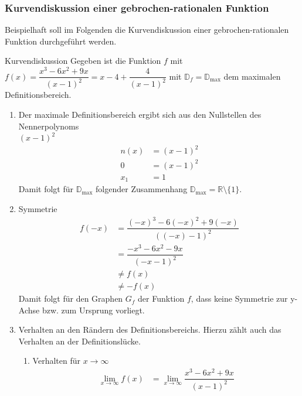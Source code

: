 \subsubsection{Kurvendiskussion einer gebrochen-rationalen Funktion}
 Beispielhaft soll im Folgenden die Kurvendiskussion einer gebrochen-rationalen Funktion durchgeführt werden. 
 \begin{bsp}{Kurvendiskussion}{}
Gegeben ist die Funktion $f$ mit $f(x) = \dfrac{x^3-6x^2+9x}{(x-1)^2} = x-4+\dfrac{4}{(x-1)^2}$ mit $\mathds{D}_f = \mathds{D}_{\text{max}}$ dem maximalen Definitionsbereich. 
 \begin{enumerate}
     \item Der maximale Definitionsbereich ergibt sich aus den Nullstellen des Nennerpolynoms\\ $(x-1)^2$
     \begin{equation*}
    \begin{split}
        n(x) &= (x-1)^2 \\
        0&= (x-1)^2\\
        x_{1} &= 1    
    \end{split}
\end{equation*}
Damit folgt für $\mathds{D}_{\text{max}}$ folgender Zusammenhang $\mathds{D}_{\text{max}} = \mathds{R}\setminus\{1\}$.
\item Symmetrie
\begin{equation*}
    \begin{split}
        f(-x) &= \dfrac{(-x)^3-6(-x)^2+9(-x)}{((-x)-1)^2} \\
        &= \dfrac{-x^3-6x^2-9x}{(-x-1)^2}\\
         &\neq  f(x)\\
         &\neq -f(x)
    \end{split}
\end{equation*}
Damit folgt für den Graphen $G_f$ der Funktion $f$, dass keine Symmetrie zur y-Achse bzw. zum Ursprung vorliegt.
 \item Verhalten an den Rändern des Definitionsbereichs. Hierzu zählt auch das Verhalten an der Definitionslücke.
 \begin{enumerate}
     \item Verhalten für $x\longrightarrow \infty$
      \begin{equation*}
    \begin{split}
        \lim_{x\longrightarrow \infty} f(x) &= \lim_{x\longrightarrow \infty} \dfrac{x^3-6x^2+9x}{(x-1)^2} \\

\end{split}
\end{equation*}
\end{enumerate}
\end{enumerate}
\end{bsp}
